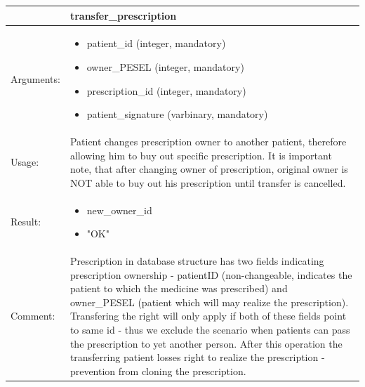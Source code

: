 \begin{table}[h]
    \begin{tabular}{| p{6cm} | p{7.75cm} |}
    \hline
     & transfer\_prescription\\ \hline
    Arguments: &  \begin{itemize}
    	\item patient\_id (integer, mandatory)
    	\item owner\_PESEL (integer, mandatory)
		\item prescription\_id (integer, mandatory)
		\item patient\_signature (varbinary, mandatory)
	\end{itemize}     \\ \hline
    Usage: & Patient changes prescription owner to another patient, therefore allowing him to buy out specific prescription. It is important note, that after changing owner of prescription, original owner is NOT able to buy out his prescription until transfer is cancelled. \\ \hline
    Result: & \begin{itemize}
    	\item new\_owner\_id
		\item "OK"

	\end{itemize}     \\ \hline	
		Comment: & Prescription in database structure has two fields indicating prescription ownership - patientID (non-changeable, indicates the patient to which the medicine was prescribed) and owner\_PESEL (patient which will may realize the prescription).
		Transfering the right will only apply if both of these fields point to same id - thus we exclude the scenario when patients can pass the prescription to yet another person. After this operation the transferring patient losses right to realize the prescription - prevention from cloning the prescription.\\ \hline
    \end{tabular}
\end{table}

